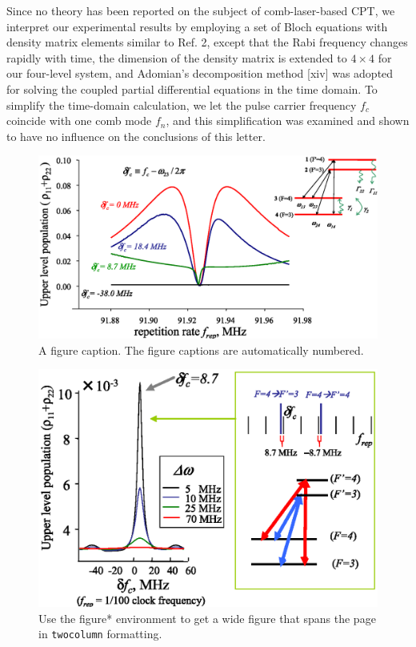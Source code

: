 \documentclass[%
aps,
prl,
showpacs,
twocolumn,
]{revtex4}
\begin{document}
Since no theory has been reported on the subject of comb-laser-based CPT, we 
interpret our experimental results by employing a set of Bloch equations with 
density matrix elements similar to Ref. 2, except that the Rabi frequency changes 
rapidly with time, the dimension of the density matrix is extended to $4 \times 4$ for our 
four-level system, and Adomian's decomposition method [xiv] was adopted for solving 
the coupled partial differential equations in the time domain. To simplify the 
time-domain calculation, we let the pulse carrier frequency $f_c$ coincide with 
one comb mode $f_n$, and this simplification was examined and shown to have no 
influence on the conclusions of this letter. 

\begin{figure}
\includegraphics[scale=0.4]{theory1_word}
\caption{\label{fig:theory1} A figure caption. The figure captions are
automatically numbered.}
\end{figure}


\begin{figure}
\includegraphics[scale=0.5]{theory2_word}%
\caption{\label{fig:wide}Use the figure* environment to get a wide
figure that spans the page in \texttt{twocolumn} formatting.}
\end{figure}
\end{document}
